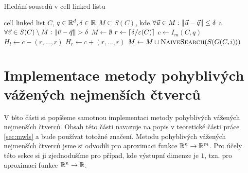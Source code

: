 \begin{algorithm}[!ht]
  \caption{Hledání sousedů v cell linked listu}
  \label{algo:cll-search-impl}
  \begin{algorithmic}
    \Require cell linked list $C$, $q \in \mathbb{R}^d, \delta \in \mathbb{R}$
    \Ensure $M \subseteq S(C)$, kde $\forall \vec{u} \in M: \|\vec{u} - \vec{q}\| \leq \delta$ a $\forall \vec{v} \in S(C) \setminus M: \|\vec{v} - \vec{q}\| > \delta$
    \State $M \leftarrow \emptyset$
    \State $r \leftarrow \lceil\delta/\varepsilon(C)\rceil$
    \State $c \leftarrow I_m(C, q)$
    \State $H_l \leftarrow c - (r, \ldots, r)$
    \State $H_r \leftarrow c + (r, \ldots, r)$
        \State $M \leftarrow M \cup \Call{NaiveSearch}{S(G(C, i))}$
      \EndIf
    \EndFor
    \State {}
  \end{algorithmic}
\end{algorithm}

\section{Implementace metody pohyblivých vážených nejmenších čtverců}

V této části si popíšeme samotnou implementaci metody pohyblivých vážených nejmenších čtverců. Obsah této části navazuje na popis v teoretické části práce \ref{sec:mwls} a bude používat totožné značení. Metodu pohyblivých vážených nejmenších čtverců jsme si odvodili pro aproximaci funkce $\mathbb{R}^n \rightarrow \mathbb{R}^m$. Pro účely této sekce si ji zjednodušíme pro případ, kde výstupní dimenze je $1$, tzn. pro aproximaci funkce $\mathbb{R}^n \rightarrow \mathbb{R}$. 

